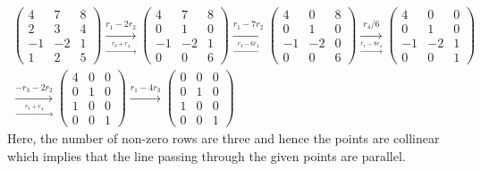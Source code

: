 \documentclass[a4paper,12pt]{article}
\begin{document}
\begin{flushleft}
\begin{align*}
\begin{pmatrix} 4 & 7 & 8\\ 2 & 3 & 4\\ -1 & -2 & 1\\ 1 & 2 & 5 \end{pmatrix}
\underset{\overset{r_3+r_4}{\longrightarrow}}{\overset{r_1 - 2r_2}{\longrightarrow}}
\begin{pmatrix} 4 & 7 & 8\\ 0 & 1 & 0\\ -1 & -2 & 1\\ 0 & 0 & 6 \end{pmatrix}
\underset{\overset{r_3-6r_4}{\longrightarrow}}{\overset{r_1 - 7r_2}{\longrightarrow}}
\begin{pmatrix} 4 & 0 & 8\\ 0 & 1 & 0\\ -1 & -2 & 0\\ 0 & 0 & 6 \end{pmatrix}
\underset{\overset{r_1-8r_4}{\longrightarrow}}{\overset{r_4/6}{\longrightarrow}}
\begin{pmatrix} 4 & 0 & 0\\ 0 & 1 & 0\\ -1 & -2 & 1\\ 0 & 0 & 1 \end{pmatrix} \\
\underset{\overset{r_3+r_4}{\longrightarrow}}{\overset{-r_3 - 2r_2}{\longrightarrow}}
\begin{pmatrix} 4 & 0 & 0\\ 0 & 1 & 0\\ 1 & 0 & 0\\ 0 & 0 & 1 \end{pmatrix}
{\overset{r_1 - 4r_3}{\longrightarrow}}
\begin{pmatrix} 0 & 0 & 0\\ 0 & 1 & 0\\ 1 & 0 & 0\\ 0 & 0 & 1 \end{pmatrix}
\end{align*}
Here, the number of non-zero rows are three and hence the points are collinear which implies that the line passing through the given points are parallel.
\end{flushleft}
\end{document}
